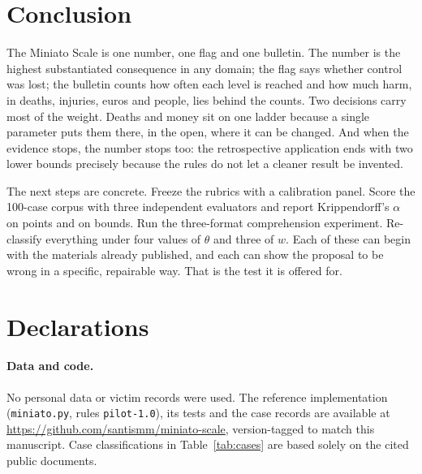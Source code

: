 \documentclass[11pt,a4paper]{article}
\begin{document}
\section{Conclusion}
\label{sec:conclusion}

The Miniato Scale is one number, one flag and one bulletin. The number is the highest substantiated consequence in any domain; the flag says whether control was lost; the bulletin counts how often each level is reached and how much harm, in deaths, injuries, euros and people, lies behind the counts. Two decisions carry most of the weight. Deaths and money sit on one ladder because a single parameter puts them there, in the open, where it can be changed. And when the evidence stops, the number stops too: the retrospective application ends with two lower bounds precisely because the rules do not let a cleaner result be invented.

The next steps are concrete. Freeze the rubrics with a calibration panel. Score the 100-case corpus with three independent evaluators and report Krippendorff's $\alpha$ on points and on bounds. Run the three-format comprehension experiment. Re-classify everything under four values of $\theta$ and three of $w$. Each of these can begin with the materials already published, and each can show the proposal to be wrong in a specific, repairable way. That is the test it is offered for.

\section*{Declarations}
\small
\paragraph{Data and code.} No personal data or victim records were used. The reference implementation (\texttt{miniato.py}, rules \texttt{pilot-1.0}), its tests and the case records are available at \url{https://github.com/santismm/miniato-scale}, version-tagged to match this manuscript. Case classifications in Table~\ref{tab:cases} are based solely on the cited public documents.
\end{document}
